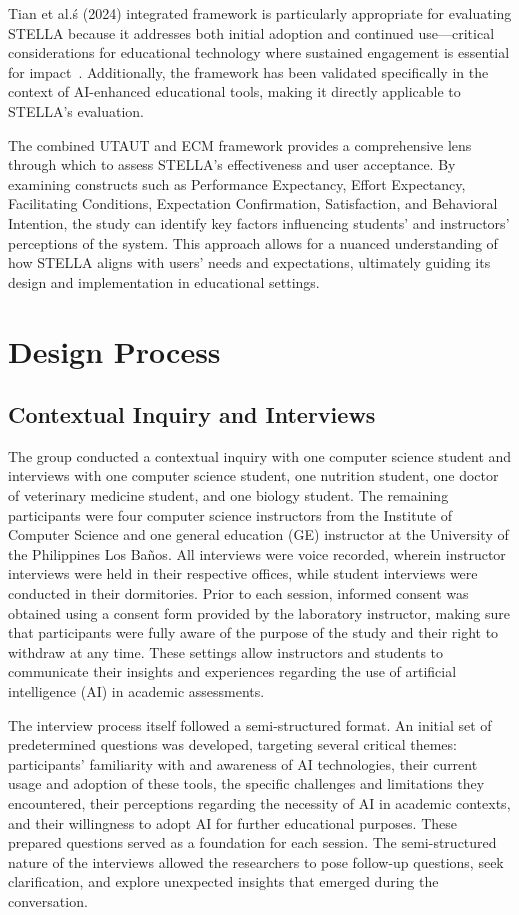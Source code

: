 \documentclass[sigconf,natbib=true]{acmart}
\begin{document}
Tian et al.\'s (2024) integrated framework is particularly appropriate for evaluating STELLA because it addresses both initial adoption and continued use—critical considerations for educational technology where sustained engagement is essential for impact~\cite{tianAIChatbotsChinese2024a}. Additionally, the framework has been validated specifically in the context of AI-enhanced educational tools, making it directly applicable to STELLA's evaluation.

The combined UTAUT and ECM framework provides a comprehensive lens through which to assess STELLA's effectiveness and user acceptance. By examining constructs such as Performance Expectancy, Effort Expectancy, Facilitating Conditions, Expectation Confirmation, Satisfaction, and Behavioral Intention, the study can identify key factors influencing students' and instructors' perceptions of the system. This approach allows for a nuanced understanding of how STELLA aligns with users' needs and expectations, ultimately guiding its design and implementation in educational settings.

\section{Design Process}
\subsection{Contextual Inquiry and Interviews}
The group conducted a contextual inquiry with one computer science student and interviews with one computer science student, one nutrition student, one doctor of veterinary medicine student, and one biology student. The remaining participants were four computer science instructors from the Institute of Computer Science and one general education (GE) instructor at the University of the Philippines  Los Baños. All interviews were voice recorded, wherein instructor interviews were held in their respective offices, while student interviews were conducted in their dormitories. Prior to each session, informed consent was obtained using a consent form provided by the laboratory instructor, making sure that participants were fully aware of the purpose of the study and their right to withdraw at any time. These settings allow instructors and students to communicate their insights and experiences regarding the use of artificial intelligence (AI) in academic assessments. 

The interview process itself followed a semi-structured format. An initial set of predetermined questions was developed, targeting several critical themes: participants' familiarity with and awareness of AI technologies, their current usage and adoption of these tools, the specific challenges and limitations they encountered, their perceptions regarding the necessity of AI in academic contexts, and their willingness to adopt AI for further educational purposes. These prepared questions served as a foundation for each session. The semi-structured nature of the interviews allowed the researchers to pose follow-up questions, seek clarification, and explore unexpected insights that emerged during the conversation.
\end{document}
